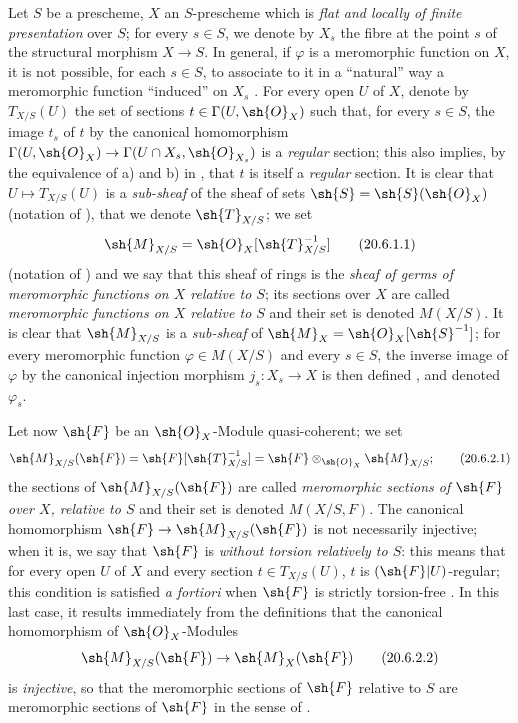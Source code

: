 \begin{env}[20.6.1]
\label{IV.20.6.1}
Let $S$ be a prescheme, $X$ an $S$-prescheme which is \emph{flat and locally of finite presentation} over $S$;
for every $s\in S$, we denote by $X_s$ the fibre at the point $s$ of the structural morphism $X\to S$.
In general, if $\varphi$ is a meromorphic function on $X$, it is not possible, for each $s\in S$, to associate to it in a ``natural'' way a meromorphic function ``induced'' on $X_s$ .
For every open $U$ of $X$, denote by $T_{X/S}(U)$ the set of sections $t\in\Gamma(U,\sh{O}_X)$ such that, for every $s\in S$, the image $t_s$ of $t$ by the canonical homomorphism $\Gamma(U,\sh{O}_X)\to\Gamma(U\cap X_s,\sh{O}_{X_s})$ is a \emph{regular} section;
this also implies, by the equivalence of a) and b) in , that $t$ is itself a \emph{regular} section.
It is clear that $U\mapsto T_{X/S}(U)$ is a \emph{sub-sheaf} of the sheaf of sets $\sh{S}=\sh{S}(\sh{O}_X)$ (notation of ), that we denote $\sh{T}_{X/S}$;
we set
\[
\label{IV.20.6.1.1}
  \sh{M}_{X/S}=\sh{O}_X[\sh{T}_{X/S}^{-1}]
  \tag{20.6.1.1}
\]
(notation of ) and we say that this sheaf of rings is the \emph{sheaf of germs of meromorphic functions on $X$ relative to $S$};
its sections over $X$ are called \emph{meromorphic functions on $X$ relative to $S$} and their set is denoted $M(X/S)$.
It is clear that $\sh{M}_{X/S}$ is a \emph{sub-sheaf} of $\sh{M}_X=\sh{O}_X[\sh{S}^{-1}]$;
for every meromorphic function $\varphi\in M(X/S)$ and every $s\in S$, the inverse image of $\varphi$ by the canonical injection morphism $j_s:X_s\to X$ is then defined , and denoted $\varphi_s$.
\end{env}

\begin{env}[20.6.2]
\label{IV.20.6.2}
Let now $\sh{F}$ be an $\sh{O}_X$-Module quasi-coherent;
we set
\[
\label{IV.20.6.2.1}
  \sh{M}_{X/S}(\sh{F})=\sh{F}[\sh{T}_{X/S}^{-1}]=\sh{F}\otimes_{\sh{O}_X}\sh{M}_{X/S};
  \tag{20.6.2.1}
\]
the sections of $\sh{M}_{X/S}(\sh{F})$ are called \emph{meromorphic sections of $\sh{F}$ over $X$, relative to $S$} and their set is denoted $M(X/S,F)$.
The canonical homomorphism $\sh{F}\to\sh{M}_{X/S}(\sh{F})$ is not necessarily injective;
when it is, we say that $\sh{F}$ is \emph{without torsion relatively to $S$}:
this means that for every open $U$ of $X$ and every section $t\in T_{X/S}(U)$, $t$ is $(\sh{F}|U)$-regular;
this condition is satisfied \emph{a fortiori} when $\sh{F}$ is strictly torsion-free .
In this last case, it results immediately from the definitions  that the canonical homomorphism of $\sh{O}_X$-Modules
\[
\label{IV.20.6.2.2}
  \sh{M}_{X/S}(\sh{F})\to\sh{M}_X(\sh{F})
  \tag{20.6.2.2}
\]
is \emph{injective}, so that the meromorphic sections of $\sh{F}$ relative to $S$ are meromorphic sections of $\sh{F}$ in the sense of .
\end{env}


